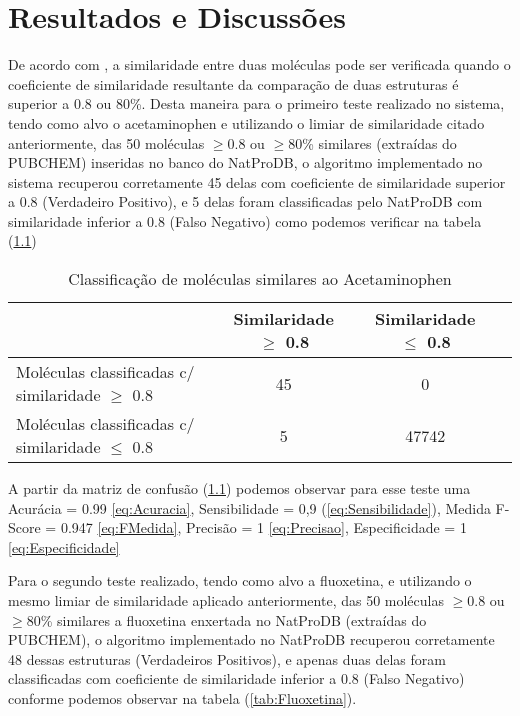 \chapter{Resultados e Discussões}
\label{chap:resul}
 
 De acordo com , a similaridade entre duas moléculas pode ser verificada quando o coeficiente de similaridade resultante da comparação de duas estruturas é superior a 0.8 ou 80\%. Desta maneira para o primeiro teste realizado no sistema, tendo como alvo o acetaminophen e utilizando o limiar de similaridade citado anteriormente, das 50 moléculas $\geq $0.8 ou $\geq $80\% similares (extraídas do PUBCHEM) inseridas no banco do NatProDB, o algoritmo implementado no sistema recuperou corretamente 45 delas com coeficiente de similaridade superior a 0.8 (Verdadeiro Positivo), e 5 delas foram classificadas pelo NatProDB com similaridade inferior a 0.8 (Falso Negativo) como podemos verificar na tabela (\ref{tab:Acetaminophen}) 
 
 \begin{table}[!htb]
	\centering
	\footnotesize
	\caption[Classificação de moléculas similares ao Acetaminophen]{Classificação de moléculas similares ao Acetaminophen}
	\label{tab:Acetaminophen}	
	\begin{tabular}{p{4cm}ccc}
		\hline \SPACE
		\textbf{}&\textbf{Similaridade $\geq $ 0.8} & \textbf{Similaridade $\leq $ 0.8} \\ \hline \SPACE
	Moléculas classificadas c/ similaridade $\geq $ 0.8  &	45 & 0 \\ \hline \SPACE
	Moléculas classificadas c/ similaridade $\leq $ 0.8  & 5 & 47742\\ \hline 
	\end{tabular}
\end{table}
A partir da matriz de confusão (\ref{tab:Acetaminophen}) podemos observar para esse teste uma Acurácia = 0.99 \eqref{eq:Acuracia}, Sensibilidade = 0,9 (\ref{eq:Sensibilidade}), Medida F-Score = 0.947 \eqref{eq:FMedida}, Precisão = 1 \eqref{eq:Precisao}, Especificidade = 1 \eqref{eq:Especificidade}

Para o segundo teste realizado, tendo como alvo a fluoxetina, e utilizando o mesmo limiar de similaridade aplicado anteriormente, das 50 moléculas $\geq $0.8 ou $\geq $80\% similares a fluoxetina enxertada no NatProDB (extraídas do PUBCHEM), o algoritmo implementado no NatProDB recuperou corretamente 48 dessas estruturas (Verdadeiros Positivos), e apenas duas delas foram classificadas com coeficiente de similaridade inferior a 0.8 (Falso Negativo) conforme podemos observar na tabela (\ref{tab:Fluoxetina}). 

